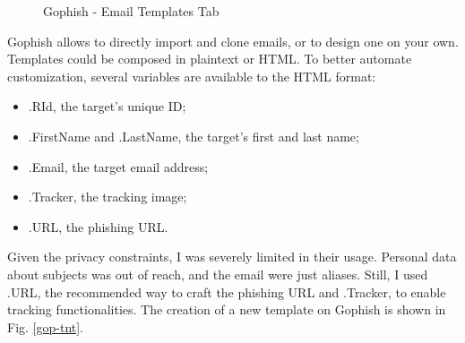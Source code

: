 \documentclass[a4paper]{article}
\begin{document}
\begin{figure}[H]
	\centering
	\caption{Gophish - Email Templates Tab}
	\label{gop-ttab}
\end{figure}

\noindent
Gophish allows to directly import and clone emails, or to design one on your own. Templates could be composed in plaintext or HTML. To better automate customization, several variables are available to the HTML format:

\begin{itemize}
    \item {{.RId}}, the target's unique ID;
    \item {{.FirstName}} and {{.LastName}}, the target's first and last name;
    \item {{.Email}}, the target email address;
    \item {{.Tracker}}, the tracking image;
    \item {{.URL}}, the phishing URL.
\end{itemize}


Given the privacy constraints, I was severely limited in their usage. Personal data about subjects was out of reach, and the email were just aliases. Still, I used {{.URL}}, the recommended way to craft the phishing URL and {{.Tracker}}, to enable tracking functionalities. The creation of a new template on Gophish is shown in Fig. \ref{gop-tnt}.
\end{document}
